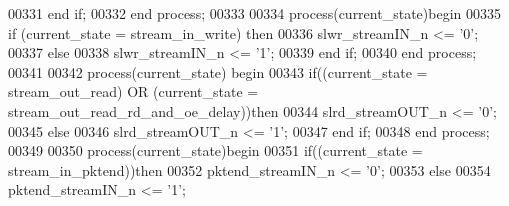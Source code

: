 \begin{DoxyCode}
00331     \textcolor{keywordflow}{end} \textcolor{keywordflow}{if};  
00332 \textcolor{keywordflow}{end} \textcolor{keywordflow}{process};
00333 
00334 \textcolor{keywordflow}{process}(current_state)\textcolor{keywordflow}{begin}
00335     \textcolor{keywordflow}{if} \textcolor{vhdlchar}{(}\textcolor{vhdlchar}{current_state} \textcolor{vhdlchar}{=} \textcolor{vhdlchar}{stream\_in\_write}\textcolor{vhdlchar}{)} \textcolor{keywordflow}{then}
00336         \textcolor{vhdlchar}{slwr_streamIN_n} \textcolor{vhdlchar}{<=} \textcolor{vhdlchar}{'}\textcolor{vhdllogic}{}\textcolor{vhdllogic}{0}\textcolor{vhdlchar}{'};
00337     \textcolor{keywordflow}{else}
00338         \textcolor{vhdlchar}{slwr_streamIN_n} \textcolor{vhdlchar}{<=} \textcolor{vhdlchar}{'}\textcolor{vhdllogic}{}\textcolor{vhdllogic}{1}\textcolor{vhdlchar}{'};
00339     \textcolor{keywordflow}{end} \textcolor{keywordflow}{if};
00340 \textcolor{keywordflow}{end} \textcolor{keywordflow}{process};
00341 
00342 \textcolor{keywordflow}{process}(current_state) \textcolor{keywordflow}{begin}
00343     \textcolor{keywordflow}{if}\textcolor{vhdlchar}{(}\textcolor{vhdlchar}{(}\textcolor{vhdlchar}{current_state} \textcolor{vhdlchar}{=} \textcolor{vhdlchar}{stream\_out\_read}\textcolor{vhdlchar}{)} \textcolor{keywordflow}{OR} \textcolor{vhdlchar}{(}\textcolor{vhdlchar}{current_state} \textcolor{vhdlchar}{=} \textcolor{vhdlchar}{stream\_out\_read\_rd\_and\_oe\_delay}\textcolor{vhdlchar}{)}\textcolor{vhdlchar}{)}\textcolor{keywordflow}{then}
00344         \textcolor{vhdlchar}{slrd_streamOUT_n} \textcolor{vhdlchar}{<=} \textcolor{vhdlchar}{'}\textcolor{vhdllogic}{}\textcolor{vhdllogic}{0}\textcolor{vhdlchar}{'};
00345     \textcolor{keywordflow}{else}
00346         \textcolor{vhdlchar}{slrd_streamOUT_n} \textcolor{vhdlchar}{<=} \textcolor{vhdlchar}{'}\textcolor{vhdllogic}{}\textcolor{vhdllogic}{1}\textcolor{vhdlchar}{'};
00347     \textcolor{keywordflow}{end} \textcolor{keywordflow}{if}; 
00348 \textcolor{keywordflow}{end} \textcolor{keywordflow}{process};
00349 
00350 \textcolor{keywordflow}{process}(current_state)\textcolor{keywordflow}{begin}
00351     \textcolor{keywordflow}{if}\textcolor{vhdlchar}{(}\textcolor{vhdlchar}{(}\textcolor{vhdlchar}{current_state} \textcolor{vhdlchar}{=} \textcolor{vhdlchar}{stream\_in\_pktend}\textcolor{vhdlchar}{)}\textcolor{vhdlchar}{)}\textcolor{keywordflow}{then}
00352         \textcolor{vhdlchar}{pktend_streamIN_n} \textcolor{vhdlchar}{<=} \textcolor{vhdlchar}{'}\textcolor{vhdllogic}{}\textcolor{vhdllogic}{0}\textcolor{vhdlchar}{'};
00353     \textcolor{keywordflow}{else}
00354         \textcolor{vhdlchar}{pktend_streamIN_n} \textcolor{vhdlchar}{<=} \textcolor{vhdlchar}{'}\textcolor{vhdllogic}{}\textcolor{vhdllogic}{1}\textcolor{vhdlchar}{'};

\end{DoxyCode}
